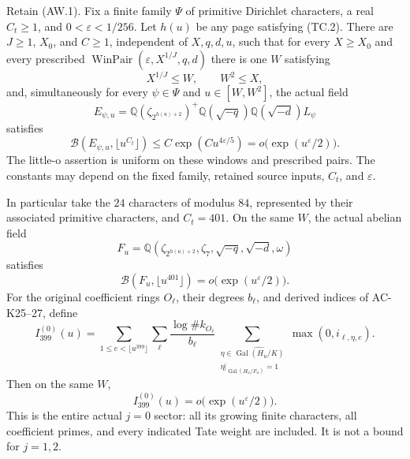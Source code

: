 \begin{theorem}
\label{AC-G172}
Retain (AW.1).  Fix a finite family $\Psi$ of primitive Dirichlet
characters, a real $C_t\geq1$, and
$0<\varepsilon<1/256$.  Let $h(u)$ be any page satisfying
(TC.2).  There are $J\geq1$, $X_0$, and $C\geq1$, independent of
$X,q,d,u$, such that for every $X\geq X_0$ and every prescribed
$\operatorname{WinPair}(\varepsilon,X^{1/J},q,d)$ there is
one $W$ satisfying
\[
 X^{1/J}\leq W,\qquad W^2\leq X,                                \tag{AW.4}
\]
and, simultaneously for every $\psi\in\Psi$ and
$u\in[W,W^2]$, the actual field
\[
 E_{\psi,u}=
 \mathbb Q(\zeta_{2^{h(u)+2}})^+
 \mathbb Q(\sqrt{-q})\mathbb Q(\sqrt{-d})L_\psi
\]
satisfies
\[
 \mathcal B(E_{\psi,u},\lfloor u^{C_t}\rfloor)
       \leq C\exp(Cu^{4\varepsilon/5})
       =o\bigl(\exp(u^\varepsilon/2)\bigr).                     \tag{AW.5}
\]
The little-o assertion is uniform on these windows and prescribed
pairs.  The constants may depend on the fixed family, retained
source inputs, $C_t$, and $\varepsilon$.

In particular take the $24$ characters of modulus $84$, represented
by their associated primitive characters, and $C_t=401$.
On the same $W$, the actual abelian field
\[
 F_u=\mathbb Q(\zeta_{2^{h(u)+2}},\zeta_7,
                   \sqrt{-q},\sqrt{-d},\omega)
\]
satisfies
\[
 \mathcal B(F_u,\lfloor u^{401}\rfloor)
               =o\bigl(\exp(u^\varepsilon/2)\bigr).             \tag{AW.6}
\]
For the original coefficient rings $O_\ell$, their degrees
$b_\ell$, and derived indices of AC-K25--27, define
\[
 I_{399}^{(0)}(u)=
 \sum_{1\leq e<\lfloor u^{399}\rfloor}\sum_\ell
 \frac{\log\#k_{O_\ell}}{b_\ell}
 \sum_{\substack{\eta\in\widehat{\operatorname{Gal}(H_u/K)}\\
                  \eta|_{\operatorname{Gal}(H_u/F_u)}=1}}
                  \max(0,i_{\ell,\eta,e}).                     \tag{AW.7}
\]
Then on the same $W$,
\[
               I_{399}^{(0)}(u)
                 =o\bigl(\exp(u^\varepsilon/2)\bigr).           \tag{AW.8}
\]
This is the entire actual $j=0$ sector: all its growing finite
characters, all coefficient primes, and every indicated Tate
weight are included.  It is not a bound for $j=1,2$.
\end{theorem}

